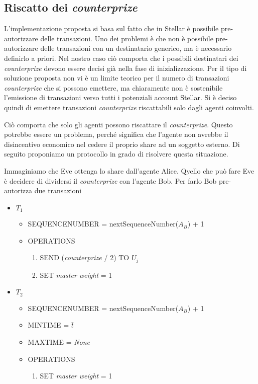 \subsection{Riscatto dei \textit{counterprize}}
L'implementazione proposta si basa sul fatto che in Stellar è possibile pre-autorizzare
delle transazioni. Uno dei problemi è che non è possibile pre-autorizzare delle transazioni con
un destinatario generico, ma è necessario definirlo a priori. Nel nostro caso ciò comporta che
i possibili destinatari dei \textit{counterprize} devono essere decisi già nella
fase di inizializzazione. Per il tipo di soluzione proposta non vi è un limite teorico
per il numero di transazioni \textit{counterprize} che si possono emettere, ma chiaramente
non è sostenibile l'emissione di transazioni verso tutti i potenziali account Stellar.
Si è deciso quindi di emettere transazioni \textit{counterprize} riscattabili solo dagli
agenti coinvolti.

Ciò comporta che solo gli agenti possono riscattare il \textit{counterprize}. Questo potrebbe
essere un problema, perché significa che l'agente non avrebbe il disincentivo economico
nel cedere il proprio share ad un soggetto esterno. Di seguito proponiamo un protocollo
in grado di risolvere questa situazione.

Immaginiamo che Eve ottenga lo share dall'agente Alice.
Qyello che può fare Eve è decidere di dividersi
il \textit{counterprize} con l'agente Bob. Per farlo Bob pre-autorizza due transazioni

\begin{itemize}
	\item $ T_1 $
	      \begin{itemize}
		      \item SEQUENCE\textunderscore NUMBER = nextSequenceNumber($ A_B $) + 1
		      \item OPERATIONS
		            \begin{enumerate}
			            \item SEND (\textit{counterprize} / 2) TO $ U_j $
			            \item SET \textit{master weight} = 1
		            \end{enumerate}
	      \end{itemize}
\end{itemize}
\begin{itemize}
	\item $ T_2 $
	      \begin{itemize}
		      \item SEQUENCE\textunderscore NUMBER = nextSequenceNumber($ A_B $) + 1
		      \item MIN\textunderscore TIME = $ \bar{t} $
		      \item MAX\textunderscore TIME =  \textit{None}
		      \item OPERATIONS
		            \begin{enumerate}
			            \item SET \textit{master weight} = 1
		            \end{enumerate}
	      \end{itemize}
\end{itemize}

